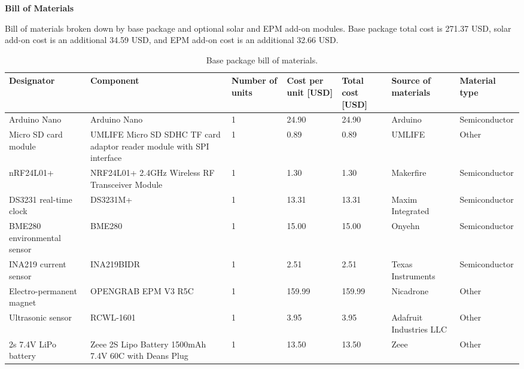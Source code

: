 \documentclass[11pt,letterpaper]{article}
\begin{document}
	
	\begin{center}
		{\Large\textbf{Bill of Materials}}
	\end{center}

\noindent Bill of materials broken down by base package and optional solar and EPM add-on modules. Base package total cost is 271.37 USD, solar add-on cost is an additional 34.59 USD, and EPM add-on cost is an additional 32.66 USD.

\setlength{\abovedisplayskip}{3pt}
\setlength{\belowdisplayskip}{3pt}

\begin{longtable}{ p{1.75cm} p{4cm} p{1.25cm} p{1cm} p{1cm} p{2cm} p{2.5cm} }	
	\caption{Base package bill of materials.} 
	\label{components} \\
	\toprule
	Designator & Component & Number of units & Cost per unit [USD] & Total cost [USD] & Source of materials & Material type \\
	\midrule
	Arduino Nano & Arduino Nano & 1 & 24.90 & 24.90 & Arduino & Semiconductor \\
	
	\rowcolor[gray]{0.925}
	Micro SD card module & UMLIFE Micro SD SDHC TF card adaptor reader module with SPI interface & 1 & 0.89 & 0.89 & UMLIFE & Other \\
	
	nRF24L01+ & NRF24L01+ 2.4GHz Wireless RF Transceiver Module & 1 & 1.30 & 1.30 & Makerfire & Semiconductor \\ 
	
	\rowcolor[gray]{0.925}
	DS3231 real-time clock & DS3231M+ & 1 & 13.31 & 13.31 & Maxim Integrated & Semiconductor \\ 
	
	BME280 environmental sensor & BME280 & 1 & 15.00 & 15.00 & Onyehn & Semiconductor \\ 
	
	\rowcolor[gray]{0.925}
	INA219 current sensor & INA219BIDR & 1 & 2.51 & 2.51 & Texas Instruments & Semiconductor \\ 
	
	Electro-permanent magnet & OPENGRAB EPM V3 R5C & 1 & 159.99 & 159.99 & Nicadrone & Other \\ 
	
	\rowcolor[gray]{0.925}
	Ultrasonic sensor & RCWL-1601 & 1 & 3.95 & 3.95 & Adafruit Industries LLC & Other \\
	
	2s 7.4V LiPo battery & Zeee 2S Lipo Battery 1500mAh 7.4V 60C with Deans Plug & 1 & 13.50 & 13.50 & Zeee & Other \\
	

\end{longtable}
\end{document}
